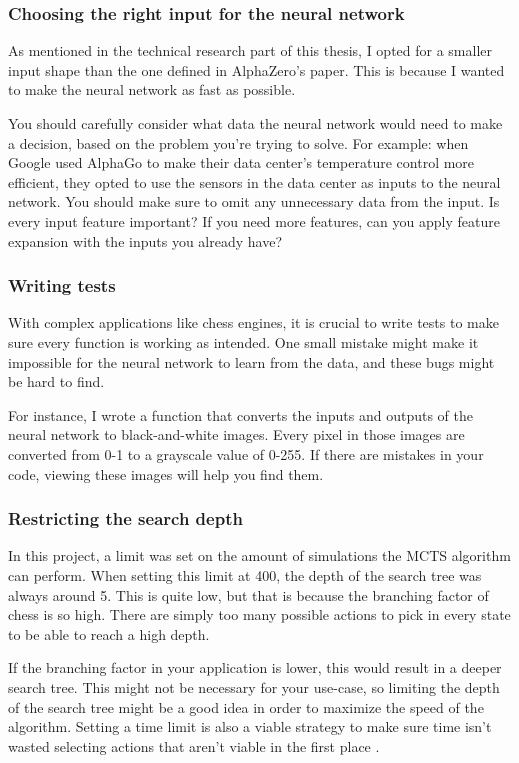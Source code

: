 \documentclass{article}
\begin{document}
\subsubsection{Choosing the right input for the neural network}

As mentioned in the technical research part of this thesis, I opted for a smaller input
shape than the one defined in AlphaZero's paper. This is because I wanted to make the 
neural network as fast as possible. 

You should carefully consider what data the neural network would need to make a decision, 
based on the problem you're trying to solve. For example: when Google used AlphaGo to make
their data center's temperature control more efficient, they opted to use the sensors in the
data center as inputs to the neural network. 
You should make sure to omit any unnecessary data from the input. Is every input feature important?
If you need more features, can you apply feature expansion with the inputs you already have?

\subsubsection{Writing tests}

With complex applications like chess engines, it is crucial to write tests to make sure
every function is working as intended. One small mistake might make it impossible for the 
neural network to learn from the data, and these bugs might be hard to find.

For instance, I wrote a function that converts the inputs and outputs of the neural network
to black-and-white images. Every pixel in those images are converted from 0-1 to a grayscale value of 0-255.
If there are mistakes in your code, viewing these images will help you find them.

\subsubsection{Restricting the search depth}

In this project, a limit was set on the amount of simulations the MCTS algorithm can perform.
When setting this limit at 400, the depth of the search tree was always around 5. This is quite low,
but that is because the branching factor of chess is so high. There are simply too many possible actions
to pick in every state to be able to reach a high depth.  

If the branching factor in your application is lower, this would result in a deeper search tree.
This might not be necessary for your use-case, so limiting the depth of the search tree might be a good idea
in order to maximize the speed of the algorithm. Setting a time limit is also a viable strategy 
to make sure time isn't wasted selecting actions that aren't viable in the first place \cite{masonAnswerHowWe2019}.
\end{document}
